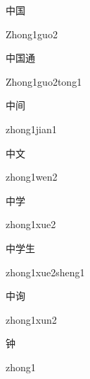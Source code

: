 \begin{multicols*}{2}
\begin{verbete}{中国}
\begin{pronuncia}{Zhong1guo2}
\end{pronuncia}
\end{verbete}

\begin{verbete}{中国通}
\begin{pronuncia}{Zhong1guo2tong1}
\end{pronuncia}
\end{verbete}

\begin{verbete}{中间}
\begin{pronuncia}{zhong1jian1}
\end{pronuncia}
\end{verbete}

\begin{verbete}{中文}
\begin{pronuncia}{zhong1wen2}
\end{pronuncia}
\end{verbete}

\begin{verbete}{中学}
\begin{pronuncia}{zhong1xue2}
\end{pronuncia}
\end{verbete}

\begin{verbete}{中学生}
\begin{pronuncia}{zhong1xue2sheng1}
\end{pronuncia}
\end{verbete}

\begin{verbete}{中询}
\begin{pronuncia}{zhong1xun2}
\end{pronuncia}
\end{verbete}

\begin{verbete}[zhong1]{钟}
\begin{pronuncia}{zhong1}
\end{pronuncia}
\end{verbete}


\end{multicols*}
